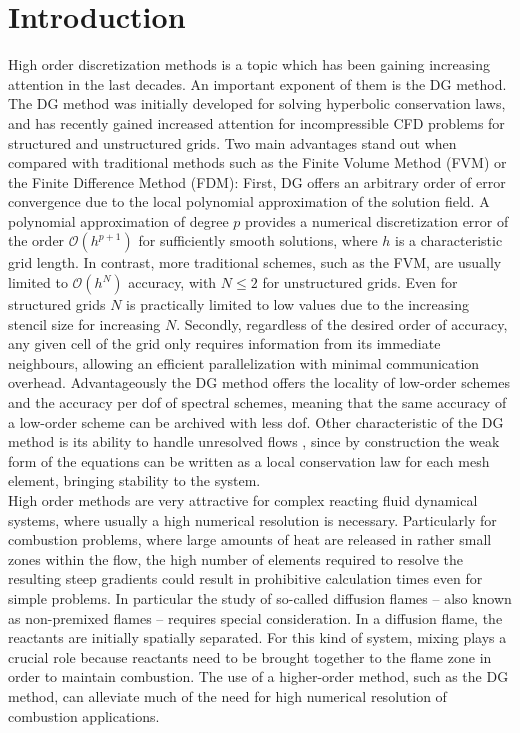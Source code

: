 \chapter{Introduction}	\label{ch:introduction}
High order discretization methods is a topic which has been gaining increasing attention in the last decades. An important exponent of them is the \gls{DG} method. The DG method was initially developed for solving hyperbolic conservation laws, and has recently gained increased attention for incompressible \gls{CFD} problems for structured and unstructured grids. Two main advantages stand out when compared with traditional methods such as the Finite Volume Method (FVM) or the Finite Difference Method (FDM): First, DG offers an arbitrary order of error convergence due to the local polynomial approximation of the solution field. A polynomial approximation of degree $p$ provides a numerical discretization error of the order  $\mathcal{O}(h^{p+1})$ for sufficiently smooth solutions, where $h$ is a characteristic grid length. In contrast, more traditional schemes, such as the FVM, are usually limited to $\mathcal{O}(h^N)$ accuracy, with $N \leq 2$ for unstructured grids. Even for structured grids $N$ is practically limited to low values due to the increasing stencil size for increasing $N$. 
Secondly, regardless of the desired order of accuracy, any given cell of the grid only requires information from its immediate neighbours, allowing an efficient parallelization with minimal communication overhead. Advantageously the DG method offers the locality of low-order schemes and the accuracy per \gls{dof} of spectral schemes, meaning that the same accuracy of a low-order scheme can be archived with less \gls{dof}. Other characteristic of the DG method is its ability to handle unresolved flows \parencite{henninkLowMachNumberFlow2022}, since by construction the weak form of the equations can be written as a local conservation law for each mesh element, bringing stability to the system.\\

High order methods are very attractive for complex reacting fluid dynamical systems, where usually a high numerical resolution is necessary. Particularly for combustion problems, where large amounts of heat are released in rather small zones within the flow, the high number of elements required to resolve the resulting steep gradients could result in prohibitive calculation times even for simple problems. In particular the study of so-called diffusion flames -- also known as non-premixed flames -- requires special consideration. In a diffusion flame, the reactants are initially spatially separated. For this kind of system, mixing plays a crucial role because reactants need to be brought together to the flame zone in order to maintain combustion. The use of a higher-order method, such as the DG method, can alleviate much of the need for high numerical resolution of combustion applications.\\

